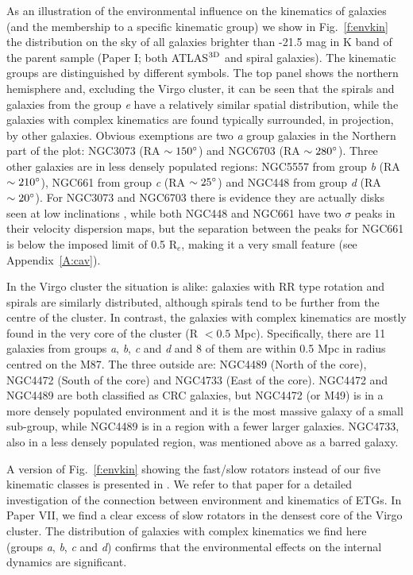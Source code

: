 \documentclass[usenatbib,usegraphicx]{mn2e}
\begin{document}
As an illustration of the environmental influence on the kinematics of galaxies (and the membership to a specific kinematic group) we show in Fig.~\ref{f:envkin} the distribution on the sky of all galaxies brighter than -21.5 mag in K band of the parent sample (Paper I; both ATLAS$^{\rm 3D}$ and spiral galaxies). The kinematic groups are distinguished by different symbols. The top panel shows the northern hemisphere and, excluding the Virgo cluster, it can be seen that the spirals and galaxies from the group {\it e} have a relatively similar spatial distribution, while the galaxies with complex kinematics are found typically surrounded, in projection, by other galaxies. Obvious exemptions are two {\it a} group galaxies in the Northern part of the plot: NGC3073 (RA $\sim150\hbox{$^\circ$}$) and NGC6703 (RA $\sim280\hbox{$^\circ$}$). Three other galaxies are in less densely populated regions: NGC5557 from group {\it b} (RA $\sim210\hbox{$^\circ$}$), NGC661 from group {\it c} (RA $\sim 25\hbox{$^\circ$}$) and NGC448 from group {\it d} (RA $\sim 20\hbox{$^\circ$}$). For NGC3073 and NGC6703 there is evidence they are actually disks seen at low inclinations \citep{1991trcb.book.....D,2011Emsellem}, while both NGC448 and NGC661 have two $\sigma$ peaks in their velocity dispersion maps, but the separation between the peaks for NGC661 is below the imposed limit of 0.5 R$_{e}$, making it a very small feature (see Appendix~\ref{A:cav}). 

In the Virgo cluster the situation is alike: galaxies with RR type rotation and spirals are similarly distributed, although spirals tend to be further from the centre of the cluster. In contrast,  the galaxies with complex kinematics are mostly found in the very core of the cluster (R $ < 0.5$ Mpc). Specifically, there are 11 galaxies from groups {\it a}, {\it b}, {\it c} and {\it d} and 8 of them are within 0.5 Mpc in radius centred on the M87. The three outside are: NGC4489 (North of the core), NGC4472 (South of the core) and NGC4733 (East of the core). NGC4472 and NGC4489 are both classified as CRC galaxies, but NGC4472 (or M49) is in a more densely populated environment and it is the most massive galaxy of a small sub-group, while NGC4489 is in a region with a fewer larger galaxies. NGC4733, also in a less densely populated region, was mentioned above as a barred galaxy.

A version of Fig.~\ref{f:envkin} showing the fast/slow rotators instead of our five kinematic classes is presented in \citet[][hereafter Paper VII]{2011bCappellari}. We refer to that paper for a detailed investigation of the connection between environment and kinematics of ETGs. In Paper VII, we find a clear excess of slow rotators in the densest core of the Virgo cluster. The distribution of galaxies with complex kinematics we find here (groups {\it a}, {\it b}, {\it c} and {\it d}) confirms that the environmental effects on the internal dynamics are significant.
\end{document}
